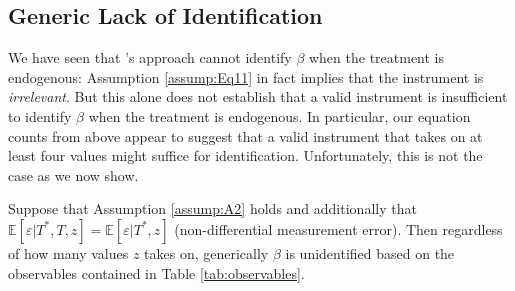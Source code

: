 \subsection{Generic Lack of Identification}
We have seen that \cite{Mahajan}'s approach cannot identify $\beta$ when the treatment is endogenous: Assumption \ref{assump:Eq11} in fact implies that the instrument is \emph{irrelevant}. 
But this alone does not establish that a valid instrument is insufficient to identify $\beta$ when the treatment is endogenous.
In particular, our equation counts from above appear to suggest that a valid instrument that takes on at least four values might suffice for identification.
Unfortunately, this is not the case as we now show.

\begin{thm}
  \label{pro:Lack}
  Suppose that Assumption \ref{assump:A2} holds and additionally that $\mathbb{E}[\varepsilon|T^*,T,z]=\mathbb{E}[\varepsilon|T^*,z]$ (non-differential measurement error).  
  Then regardless of how many values $z$ takes on, generically $\beta$ is unidentified based on the observables contained in Table \ref{tab:observables}.
\end{thm}
